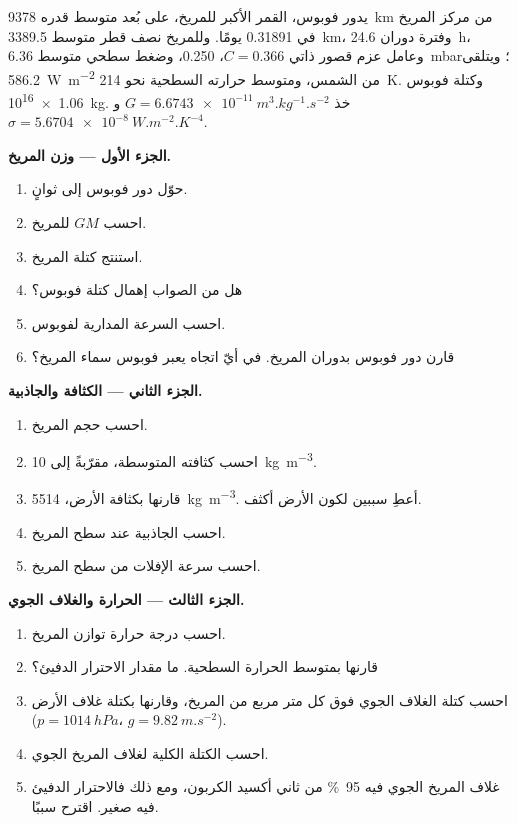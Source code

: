 \begin{problem}
\label{pb:b1:comparative-planetology:1}
يدور فوبوس، القمر الأكبر للمريخ، على بُعد متوسط قدره \qty{9378}{km} من مركز المريخ في \num{0.31891} يومًا. وللمريخ نصف قطر متوسط \qty{3389.5}{km}، وفترة دوران \qty{24.6}{h}، وعامل عزم قصور ذاتي $C = 0.366$،  0.250، وضغط سطحي متوسط \qty{6.36}{mbar}؛ ويتلقى \qty{586.2}{W.m^{-2}} من الشمس، ومتوسط حرارته السطحية نحو \qty{214}{K}. وكتلة فوبوس \qty{1.06e16}{kg}. خذ $G = \qty{6.6743e-11}{m^3.kg^{-1}.s^{-2}}$ و$\sigma = \qty{5.6704e-8}{W.m^{-2}.K^{-4}}$.

\medskip
\noindent\textbf{الجزء الأول --- وزن المريخ.}
\begin{enumerate}
  \item حوّل دور فوبوس إلى ثوانٍ.
  \item احسب $GM$ للمريخ.
  \item استنتج كتلة المريخ.
  \item هل من الصواب إهمال كتلة فوبوس؟
  \item احسب السرعة المدارية لفوبوس.
  \item قارن دور فوبوس بدوران المريخ. في أيّ اتجاه يعبر فوبوس سماء المريخ؟
\end{enumerate}

\medskip
\noindent\textbf{الجزء الثاني --- الكثافة والجاذبية.}
\begin{enumerate}[resume]
  \item احسب حجم المريخ.
  \item احسب كثافته المتوسطة، مقرّبةً إلى \qty{10}{kg.m^{-3}}.
  \item قارنها بكثافة الأرض، \qty{5514}{kg.m^{-3}}. أعطِ سببين لكون الأرض أكثف.
  \item احسب الجاذبية عند سطح المريخ.
  \item احسب سرعة الإفلات من سطح المريخ.
\end{enumerate}

\medskip
\noindent\textbf{الجزء الثالث --- الحرارة والغلاف الجوي.}
\begin{enumerate}[resume]
  \item احسب درجة حرارة توازن المريخ.
  \item قارنها بمتوسط الحرارة السطحية. ما مقدار الاحترار الدفيئ؟
  \item احسب كتلة الغلاف الجوي فوق كل متر مربع من المريخ، وقارنها بكتلة غلاف الأرض ($p = \qty{1014}{hPa}$، $g = \qty{9.82}{m.s^{-2}}$).
  \item احسب الكتلة الكلية لغلاف المريخ الجوي.
  \item غلاف المريخ الجوي فيه \qty{95}{\percent} من ثاني أكسيد الكربون، ومع ذلك فالاحترار الدفيئ فيه صغير. اقترح سببًا.
\end{enumerate}


\end{problem}
